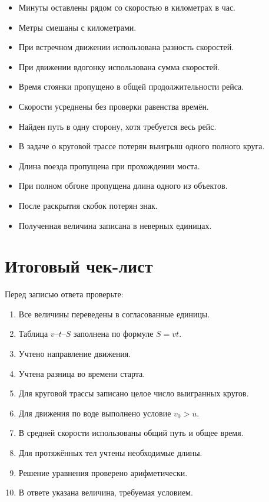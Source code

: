 \documentclass[a4paper,12pt]{article}
\begin{document}
\begin{itemize}
  \item Минуты оставлены рядом со скоростью в километрах в час.
  \item Метры смешаны с километрами.
  \item При встречном движении использована разность скоростей.
  \item При движении вдогонку использована сумма скоростей.
  \item Время стоянки пропущено в общей продолжительности рейса.
  \item Скорости усреднены без проверки равенства времён.
  \item Найден путь в одну сторону, хотя требуется весь рейс.
  \item В задаче о круговой трассе потерян выигрыш одного полного круга.
  \item Длина поезда пропущена при прохождении моста.
  \item При полном обгоне пропущена длина одного из объектов.
  \item После раскрытия скобок потерян знак.
  \item Полученная величина записана в неверных единицах.
\end{itemize}

\section{Итоговый чек-лист}

Перед записью ответа проверьте:

\begin{enumerate}
  \item Все величины переведены в согласованные единицы.
  \item Таблица $v$--$t$--$S$ заполнена по формуле $S=vt$.
  \item Учтено направление движения.
  \item Учтена разница во времени старта.
  \item Для круговой трассы записано целое число выигранных кругов.
  \item Для движения по воде выполнено условие $v_0>u$.
  \item В средней скорости использованы общий путь и общее время.
  \item Для протяжённых тел учтены необходимые длины.
  \item Решение уравнения проверено арифметически.
  \item В ответе указана величина, требуемая условием.
\end{enumerate}
\end{document}
